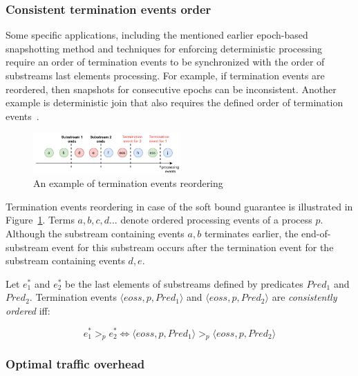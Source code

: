 \subsubsection{Consistent termination events order}
Some specific applications, including the mentioned earlier epoch-based snapshotting method and techniques for enforcing deterministic processing~\cite{we2018adbis} require an order of termination events to be synchronized with the order of substreams last elements processing. For example, if termination events are reordered, then snapshots for consecutive epochs can be inconsistent. Another example is deterministic join that also requires the defined order of termination events~\cite{gulisano2016scalejoin}.

\begin{figure}[t]
  \centering
  \includegraphics[width=0.50\textwidth]{pics/notifications-reordering.pdf}
  \caption{An example of termination events reordering}
  \label{notifications_reordering}
\end{figure}

Termination events reordering in case of the soft bound guarantee is illustrated in Figure~\ref{notifications_reordering}. Terms $a,b,c,d...$ denote ordered processing events of a process $p$. Although the substream containing events $a,b$ terminates earlier, the end-of-substream event for this substream occurs after the termination event for the substream containing events $d,e$. 

\begin{definition}
Let $e^{*}_1$ and $e^{*}_2$ be the last elements of substreams defined by predicates $Pred_1$ and $Pred_2$. Termination events $\langle eoss, p, Pred_1\rangle$ and $\langle eoss, p, Pred_2\rangle$ are {\em consistently ordered} iff:

\begin{equation}
e^{*}_1 >_p e^{*}_2 \Leftrightarrow \langle eoss, p, Pred_1\rangle >_p \langle eoss, p, Pred_2\rangle
\end{equation}
\end{definition}

\subsubsection{Optimal traffic overhead}

